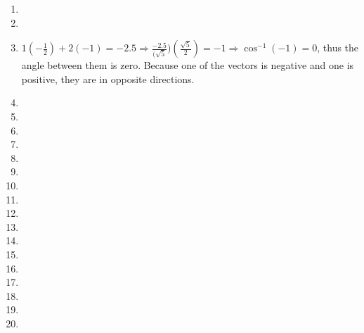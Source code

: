 \begin{enumerate}
\begin{itemize}
    \end{itemize}

    \setcounter{enumi}{8}

  \item

  \item

    \setcounter{enumi}{12}

  \item $1\left( -\frac{1}{2} \right) + 2(-1)=-2.5\Rightarrow \frac{-2.5}{(\sqrt{5}})\left( \frac{\sqrt{5}}{2} \right)=-1\Rightarrow \cos^{-1}(-1)=0$, thus the angle between them is zero. Because one of the vectors is negative and one is positive, they are in opposite directions. 

  \item

  \item

  \item

    \setcounter{enumi}{18}

  \item

  \item

  \item

    \setcounter{enumi}{22}

  \item

  \item

    \setcounter{enumi}{26}

  \item

    \setcounter{enumi}{28}

  \item

    \setcounter{enumi}{32}

  \item

    \setcounter{enumi}{35}

  \item

    \setcounter{enumi}{40}

  \item

  \item

  \item

    \setcounter{enumi}{44}

  \item

  \item

\end{enumerate}



